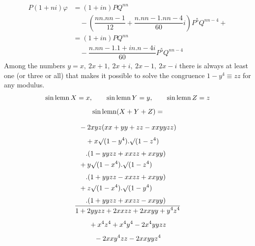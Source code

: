 \[
\begin{aligned}
P(1+ni)\varphi
 &= (1+in)PQ^{nn}
 \\[5pt]&\quad{}-\left(\dfrac{nn.nn-1}{12}+\dfrac{n.nn-1.nn-4}{60}i\right)P^5Q^{nn-4}+{}\\[7pt]
 &= (1+in)PQ^{nn}\\[5pt]&\quad{}-\dfrac{n.nn-1.1+in.n-4i}{60}P^5Q^{nn-4}
\end{aligned}
\]
Among the numbers $y=x,\ 2x+1,\ 2x+i,\ 2x-1,\ 2x-i$ there is always at least one (or three or all) that makes it possible to solve the congruence $1-y^4\equiv zz$ for any modulus.
\[
\operatorname{sin\,lemn} X=x,\qquad \operatorname{sin\,lemn} Y=y,\qquad \operatorname{sin\,lemn} Z=z
\]
\[
\begin{gathered}\operatorname{sin\,lemn}(X+Y+Z)=\\[7pt]
\dfrac{\begin{aligned}
 &-2xyz(xx+yy+zz-xxyyzz)\\[4pt]&\quad{}+x\surd(1-y^4).\surd(1-z^4)\\[3pt]&\quad{}.(1-yyzz+xxzz+xxyy)\\
 &+y\surd(1-x^4).\surd(1-z^4)\\[3pt]&\quad{}.(1+yyzz-xxzz+xxyy)\\
 &+z\surd(1-x^4).\surd(1-y^4)\\[3pt]&\quad{}.(1+yyzz+xxzz-xxyy)
\end{aligned}}{\begin{gathered}1+2yyzz+2xxzz+2xxyy+y^4z^4\\[4pt]{}+x^4z^4+x^4y^4-2x^4yyzz\\[4pt]{}-2xxy^4zz-2xxyyz^4\end{gathered}}\end{gathered}
\]


